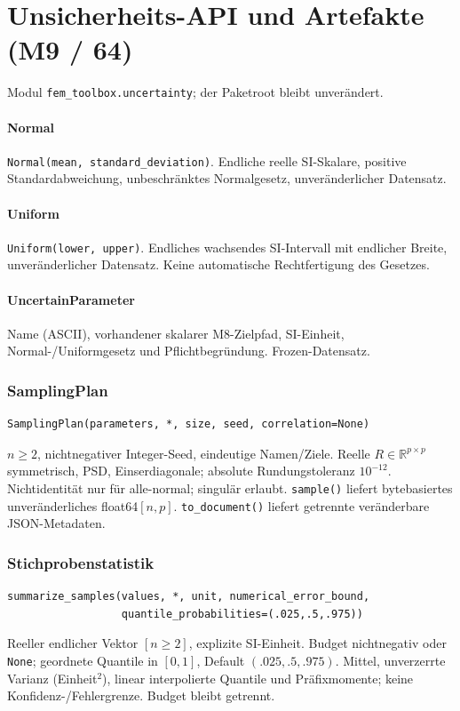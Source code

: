 \begingroup
\raggedright
\section{Unsicherheits-API und Artefakte (M9 / 64)}
Modul \texttt{fem\_toolbox.uncertainty}; der Paketroot bleibt unverändert.

\paragraph{Normal} \texttt{Normal(mean, standard\_deviation)}. Endliche reelle SI-Skalare,
positive Standardabweichung, unbeschränktes Normalgesetz, unveränderlicher Datensatz.
\paragraph{Uniform} \texttt{Uniform(lower, upper)}. Endliches wachsendes SI-Intervall mit endlicher
Breite, unveränderlicher Datensatz. Keine automatische Rechtfertigung des Gesetzes.
\paragraph{UncertainParameter} Name (ASCII), vorhandener skalarer M8-Zielpfad,
SI-Einheit, Normal-/Uniformgesetz und Pflichtbegründung. Frozen-Datensatz.
\subsubsection*{SamplingPlan}
\begin{lstlisting}
SamplingPlan(parameters, *, size, seed, correlation=None)
\end{lstlisting}
$n\ge2$, nichtnegativer Integer-Seed, eindeutige Namen/Ziele. Reelle
$R\in\mathbb R^{p\times p}$ symmetrisch, PSD, Einserdiagonale; absolute
Rundungstoleranz $10^{-12}$. Nichtidentität nur für alle-normal; singulär erlaubt.
\texttt{sample()} liefert bytebasiertes unveränderliches float64$[n,p]$.
\texttt{to\_document()} liefert getrennte veränderbare JSON-Metadaten.
\subsubsection*{Stichprobenstatistik}
\begin{lstlisting}
summarize_samples(values, *, unit, numerical_error_bound,
                  quantile_probabilities=(.025,.5,.975))
\end{lstlisting}
Reeller endlicher Vektor $[n\ge2]$, explizite SI-Einheit. Budget nichtnegativ
oder \texttt{None}; geordnete Quantile in $[0,1]$, Default $(.025,.5,.975)$.
Mittel, unverzerrte Varianz (Einheit$^2$), linear interpolierte Quantile und
Präfixmomente; keine Konfidenz-/Fehlergrenze. Budget bleibt getrennt.
